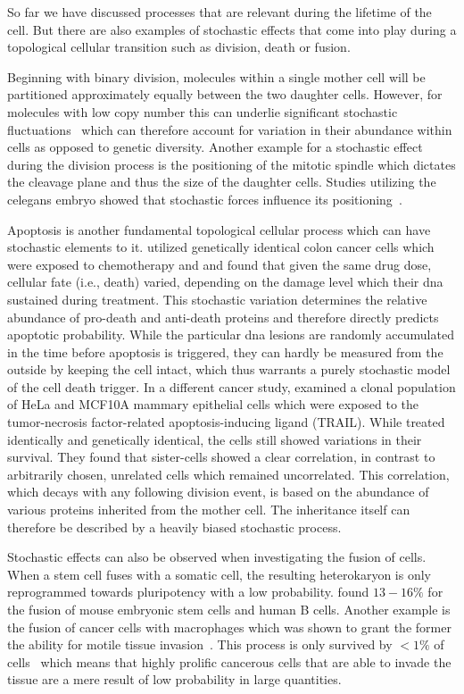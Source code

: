 So far we have discussed processes that are relevant during the lifetime of the cell.
But there are also examples of stochastic effects that come into play during a topological cellular
transition such as division, death or fusion.

Beginning with binary division, molecules within a single mother cell will be partitioned
approximately equally between the two daughter cells.
However, for molecules with low copy number this can underlie significant stochastic
fluctuations~\cite{Huh2010} which can therefore account for variation in their abundance within
cells as opposed to genetic diversity.
Another example for a stochastic effect during the division process is the positioning of the
mitotic spindle which dictates the cleavage plane and thus the size of the daughter cells.
Studies utilizing the \ac{celegans} embryo showed that stochastic forces influence its
positioning~\cite{Pecreaux2006,Grill2001}.

Apoptosis is another fundamental topological cellular process which can have stochastic elements to
it.
\citet{Paek2016} utilized genetically identical colon cancer cells which were exposed to
chemotherapy and and found that given the same drug dose, cellular fate (i.e., death) varied,
depending on the damage level which their \ac{dna} sustained during treatment.
This stochastic variation determines the relative abundance of pro-death and anti-death proteins and
therefore directly predicts apoptotic probability.
While the particular \ac{dna} lesions are randomly accumulated in the time before apoptosis is
triggered, they can hardly be measured from the outside by keeping the cell intact, which thus
warrants a purely stochastic model of the cell death trigger.
In a different cancer study, \citet{Spencer2009} examined a clonal population of HeLa and MCF10A
mammary epithelial cells which were exposed to the tumor-necrosis factor-related apoptosis-inducing
ligand (TRAIL).
While treated identically and genetically identical, the cells still showed variations in their
survival.
They found that sister-cells showed a clear correlation, in contrast to arbitrarily chosen,
unrelated cells which remained uncorrelated.
This correlation, which decays with any following division event, is based on the abundance of
various proteins inherited from the mother cell.
The inheritance itself can therefore be described by a heavily biased stochastic process.

Stochastic effects can also be observed when investigating the fusion of cells.
When a stem cell fuses with a somatic cell, the resulting heterokaryon is only reprogrammed
towards pluripotency with a low probability.
\citet{Pereira2008} found $13-16\%$ for the fusion of mouse embryonic stem cells and human B cells.
Another example is the fusion of cancer cells with macrophages which was shown to grant the
former the ability for motile tissue invasion~\cite{Pawelek2008,Powell2011,Gast2018}.
This process is only survived by $<1\%$ of cells~\cite{BastidaRuiz2016,Hass2021,Hass2021a} which
means that highly prolific cancerous cells that are able to invade the tissue are a mere result of
low probability in large quantities.


